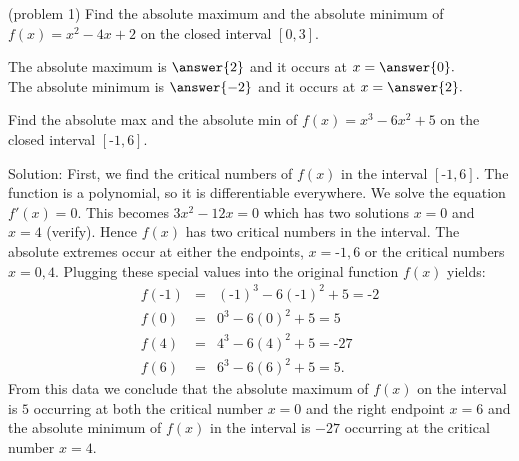 \documentclass{ximera}
\begin{document}
\begin{problem}(problem 1)
Find the absolute maximum and the absolute minimum of $f(x) = x^2 - 4x + 2$
on the closed interval $[0, 3]$.

The absolute maximum is $\answer{2}$ and it occurs at $x = \answer{0}.$\\
The absolute minimum is $\answer{-2}$ and it occurs at $x = \answer{2}.$ 

\end{problem}



\begin{example}[example 2]
 Find the absolute max and the absolute min of $f(x) = x^3 - 6x^2 + 5$ on the closed interval $[\text{-}1, 6]$.

Solution:  First, we find the critical numbers of $f(x)$ in the interval $[\text{-}1, 6]$. 
The function is a polynomial, so it is differentiable everywhere.  
We solve the equation $f'(x) =0$.  This becomes $3x^2 -12x= 0$ which has two solutions $x=0$ and $x = 4$ (verify).
Hence $f(x)$ has two critical numbers in the interval.
The absolute extremes occur at either the endpoints, $x=\text{-}1, 6$ or the critical numbers $x = 0, 4$.  
Plugging these special values into the original function $f(x)$ yields:
\begin{eqnarray*}
f(\text{-}1) &=& (\text{-}1)^3 -6(\text{-}1)^2 + 5 = \text{-}2\\
f(0) &=& 0^3 - 6(0)^2 + 5 =5\\
f(4) &=& 4^3 - 6(4)^2 + 5 = \text{-}27\\
f(6) &=& 6^3 - 6(6)^2 + 5 = 5.
\end{eqnarray*}
From this data we conclude that the absolute maximum of $f(x)$ on the interval is $5$ occurring 
at both the critical number $x = 0$ and the right endpoint $x = 6$ and 
the absolute minimum of $f(x)$ in the interval is $-27$
occurring at the critical number $x = 4$.
\begin{image}
\end{image}
\end{example}
\end{document}
